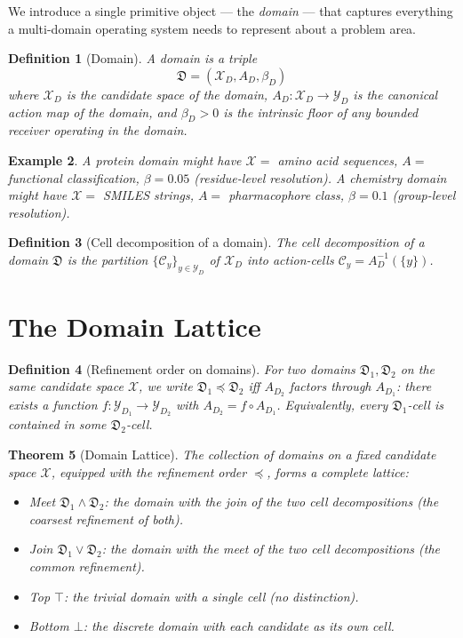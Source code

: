 \documentclass[twocolumn,11pt,a4paper]{article}
\newtheorem{theorem}{Theorem}[section]
\newtheorem{definition}[theorem]{Definition}
\newtheorem{example}[theorem]{Example}
\newcommand{\Cands}{\mathcal{X}}
\newcommand{\Action}{\mathcal{Y}}
\newcommand{\Cell}{\mathcal{C}}
\newcommand{\Domain}{\mathfrak{D}}
\begin{document}
We introduce a single primitive object — the \emph{domain} — that captures everything a multi-domain operating system needs to represent about a problem area.

\begin{definition}[Domain]
\label{def:domain}
A \emph{domain} is a triple
\[
\Domain = (\Cands_D, A_D, \beta_D)
\]
where $\Cands_D$ is the candidate space of the domain, $A_D : \Cands_D \to \Action_D$ is the canonical action map of the domain, and $\beta_D > 0$ is the intrinsic floor of any bounded receiver operating in the domain.
\end{definition}

\begin{example}
A protein domain might have $\Cands = $ amino acid sequences, $A = $ functional classification, $\beta = 0.05$ (residue-level resolution). A chemistry domain might have $\Cands = $ SMILES strings, $A = $ pharmacophore class, $\beta = 0.1$ (group-level resolution).
\end{example}

\begin{definition}[Cell decomposition of a domain]
\label{def:cell-decomp}
The \emph{cell decomposition} of a domain $\Domain$ is the partition $\{\Cell_y\}_{y \in \Action_D}$ of $\Cands_D$ into action-cells $\Cell_y = A_D^{-1}(\{y\})$.
\end{definition}

\section{The Domain Lattice}
\label{sec:domain-lattice}

\begin{definition}[Refinement order on domains]
\label{def:refinement-order}
For two domains $\Domain_1, \Domain_2$ on the same candidate space $\Cands$, we write $\Domain_1 \preceq \Domain_2$ iff $A_{D_2}$ factors through $A_{D_1}$: there exists a function $f : \Action_{D_1} \to \Action_{D_2}$ with $A_{D_2} = f \circ A_{D_1}$. Equivalently, every $\Domain_1$-cell is contained in some $\Domain_2$-cell.
\end{definition}

\begin{theorem}[Domain Lattice]
\label{thm:domain-lattice}
The collection of domains on a fixed candidate space $\Cands$, equipped with the refinement order $\preceq$, forms a complete lattice:
\begin{itemize}[nosep, leftmargin=*]
\item \emph{Meet} $\Domain_1 \wedge \Domain_2$: the domain with the join of the two cell decompositions (the coarsest refinement of both).
\item \emph{Join} $\Domain_1 \vee \Domain_2$: the domain with the meet of the two cell decompositions (the common refinement).
\item \emph{Top} $\top$: the trivial domain with a single cell (no distinction).
\item \emph{Bottom} $\bot$: the discrete domain with each candidate as its own cell.
\end{itemize}
\end{theorem}
\end{document}
